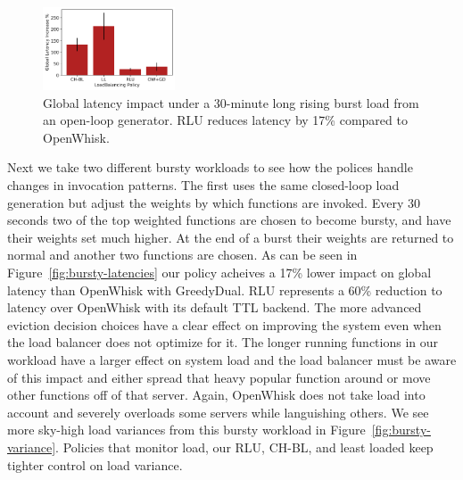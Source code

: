 

\begin{figure}
  \includegraphics[width=0.35\textwidth]{../figs/ow/openload/openload-latencies-cntnorm.pdf}
  \vspace*{-0.3cm}
  \caption{Global latency impact under a 30-minute long rising burst load from an open-loop generator. RLU reduces  latency by 17\% compared to OpenWhisk.}
  \label{fig:bursty-openload}
    \vspace*{-0.3cm}
\end{figure}

Next we take two different bursty workloads to see how the polices handle changes in invocation patterns.
The first uses the same closed-loop load generation but adjust the weights by which functions are invoked.
Every 30 seconds two of the top weighted functions are chosen to become bursty, and have their weights set much higher.
At the end of a burst their weights are returned to normal and another two functions are chosen.
As can be seen in Figure~\ref{fig:bursty-latencies} our policy acheives a 17\% lower impact on global latency than OpenWhisk with GreedyDual.
RLU represents a 60\% reduction to latency over OpenWhisk with its default TTL backend.
The more advanced eviction decision choices have a clear effect on improving the system even when the load balancer does not optimize for it.
The longer running functions in our workload have a larger effect on system load and the load balancer must be aware of this impact and either spread that heavy popular function around or move other functions off of that server.
Again, OpenWhisk does not take load into account and severely overloads some servers while languishing others.
We see more sky-high load variances from this bursty workload in Figure~\ref{fig:bursty-variance}.
Policies that monitor load, our RLU, CH-BL, and least loaded keep tighter control on load variance.

